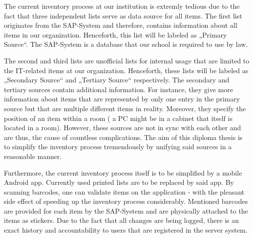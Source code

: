 The current inventory process at our institution is extremly tedious due to the fact that three independent lists serve as 
data source for all items. The first list originates from the SAP-System and therefore, contains information about all items in our organization.
Henceforth, this list will be labeled as „Primary Source“. The SAP-System is a database that our school is required to use by law. 

The second and third lists are unofficial lists for internal usage that are limited to the IT-related items at our organization. 
Henceforth, these lists will be labeled as „Secondary Source“ and „Tertiary Source“ respectively.
The secondary and tertiary sources contain additional information. For instance, they give more information about items that are represented by only one entry in the primary source but that are multiple different items in reality. Moreover, they specify the position of an item within a room (\eg{} a PC might be in a cabinet that itself is located in a room).
However, these sources are not in sync with each other and are thus, the cause 
of countless complications. The aim of this diploma thesis is to simplify the inventory process tremendously by unifying said sources in a reasonable manner.

Furthermore, the current inventory process itself is to be simplified by a mobile Android app. Currently used printed lists are to be replaced 
by said app. By scanning barcodes, one can validate items on the application - with the pleasant side effect of speeding up the inventory process
considerably. Mentioned barcodes are provided for each item by the SAP-System and are physically attached to the items as stickers. 
Due to the fact that all changes are being logged, there is an exact history and accountability to users that are registered in the server system.